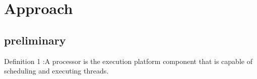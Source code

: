 \section{Approach}
\subsection{preliminary}
Definition 1 :A processor is the execution platform component that is capable of scheduling and executing threads.
